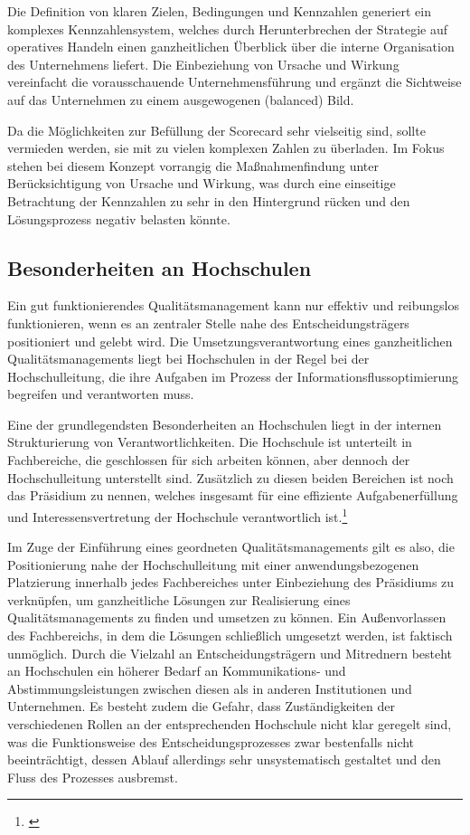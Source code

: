 Die Definition von klaren Zielen, Bedingungen und Kennzahlen generiert ein komplexes Kennzahlensystem, welches durch Herunterbrechen der Strategie auf operatives Handeln einen ganzheitlichen Überblick über die interne Organisation des Unternehmens liefert. Die Einbeziehung von Ursache und Wirkung vereinfacht die vorausschauende Unternehmensführung und ergänzt die Sichtweise auf das Unternehmen zu einem ausgewogenen (balanced) Bild. 

Da die Möglichkeiten zur Befüllung der Scorecard sehr vielseitig sind, sollte vermieden werden, sie mit zu vielen komplexen Zahlen zu überladen. Im Fokus stehen bei diesem Konzept vorrangig die Maßnahmenfindung unter Berücksichtigung von Ursache und Wirkung, was durch eine einseitige Betrachtung der Kennzahlen zu sehr in den Hintergrund rücken und den Lösungsprozess negativ belasten könnte.

\subsection{Besonderheiten an Hochschulen}
Ein gut funktionierendes Qualitätsmanagement kann nur effektiv und reibungslos funktionieren, wenn es an zentraler Stelle nahe des Entscheidungsträgers positioniert und gelebt wird. Die Umsetzungsverantwortung eines ganzheitlichen Qualitätsmanagements liegt bei Hochschulen in der Regel bei der Hochschulleitung, die ihre Aufgaben im Prozess der Informationsflussoptimierung begreifen und verantworten muss. 

Eine der grundlegendsten Besonderheiten an Hochschulen liegt in der internen Strukturierung von Verantwortlichkeiten. Die Hochschule ist unterteilt in Fachbereiche, die geschlossen für sich arbeiten können, aber dennoch der Hochschulleitung unterstellt sind. Zusätzlich zu diesen beiden Bereichen ist noch das Präsidium zu nennen, welches insgesamt für eine effiziente Aufgabenerfüllung und Interessensvertretung der Hochschule verantwortlich ist.\footnote{\cite{mintzberg_1992}}

Im Zuge der Einführung eines geordneten Qualitätsmanagements gilt es also, die Positionierung nahe der Hochschulleitung mit einer anwendungsbezogenen Platzierung innerhalb jedes Fachbereiches unter Einbeziehung des Präsidiums zu verknüpfen, um ganzheitliche Lösungen zur Realisierung eines Qualitätsmanagements zu finden und umsetzen zu können. Ein Außenvorlassen des Fachbereichs, in dem die Lösungen schließlich umgesetzt werden, ist faktisch unmöglich. Durch die Vielzahl an Entscheidungsträgern und Mitrednern besteht an Hochschulen ein höherer Bedarf an Kommunikations- und Abstimmungsleistungen zwischen diesen als in anderen Institutionen und Unternehmen. Es besteht zudem die Gefahr, dass Zuständigkeiten der verschiedenen Rollen an der entsprechenden Hochschule nicht klar geregelt sind, was die Funktionsweise des Entscheidungsprozesses zwar bestenfalls nicht beeinträchtigt, dessen Ablauf allerdings sehr unsystematisch gestaltet und den Fluss des Prozesses ausbremst.

